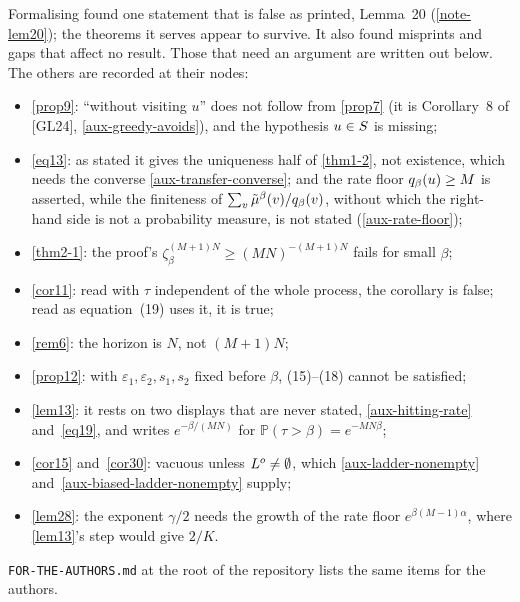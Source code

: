 Formalising found one statement that is false as printed, Lemma~20
(\ref{note-lem20}); the theorems it serves appear to survive.  It also found
misprints and gaps that affect no result.  Those that need an argument are
written out below.  The others are recorded at their nodes:
\begin{itemize}
  \item \ref{prop9}: ``without visiting $u$'' does not follow from \ref{prop7}
    (it is Corollary~8 of [GL24], \ref{aux-greedy-avoids}), and the hypothesis
    $u \in S$ is missing;
  \item \ref{eq13}: as stated it gives the uniqueness half of \ref{thm1-2}, not
    existence, which needs the converse \ref{aux-transfer-converse}; and the
    rate floor $q_\beta(u) \ge M$ is asserted, while the finiteness of
    $\sum_v \tilde{\mu}^\beta(v)/q_\beta(v)$, without which the right-hand side is not a
    probability measure, is not stated (\ref{aux-rate-floor});
  \item \ref{thm2-1}: the proof's $\zeta_\beta^{(M+1)N} \ge (MN)^{-(M+1)N}$ fails
    for small $\beta$;
  \item \ref{cor11}: read with $\tau$ independent of the whole process, the
    corollary is false; read as equation~(19) uses it, it is true;
  \item \ref{rem6}: the horizon is $N$, not $(M+1)N$;
  \item \ref{prop12}: with $\varepsilon_1, \varepsilon_2, s_1, s_2$ fixed before
    $\beta$, (15)--(18) cannot be satisfied;
  \item \ref{lem13}: it rests on two displays that are never stated,
    \ref{aux-hitting-rate} and~\ref{eq19}, and writes $e^{-\beta/(MN)}$ for
    $\mathbb{P}(\tau > \beta) = e^{-MN\beta}$;
  \item \ref{cor15} and~\ref{cor30}: vacuous unless $L^o \ne \emptyset$,
    which \ref{aux-ladder-nonempty} and~\ref{aux-biased-ladder-nonempty} supply;
  \item \ref{lem28}: the exponent $\gamma/2$ needs the growth of the rate floor
    $e^{\beta(M-1)\alpha}$, where \ref{lem13}'s step would give $2/K$.
\end{itemize}
\texttt{FOR-THE-AUTHORS.md} at the root of the repository lists the same items
for the authors.

